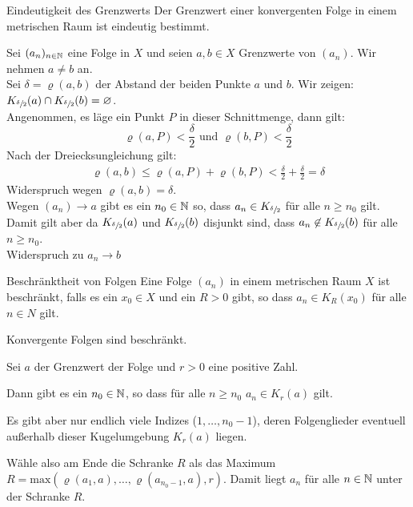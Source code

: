 \begin{satz}{Eindeutigkeit des Grenzwerts}
	Der Grenzwert einer konvergenten Folge in einem metrischen Raum ist eindeutig bestimmt.
\end{satz}
\beweis
Sei $(a_n)_{n\in\mathbb{N}}$ eine Folge in $X$ und seien $a,b\in X$ Grenzwerte von $(a_n)$. Wir nehmen $a\neq b$ an.\\
Sei $\delta=\varrho(a,b)$ der Abstand der beiden Punkte $a$ und $b$. Wir zeigen: $K_{\sfrac{\delta}{2}}(a)\cap K_{\sfrac{\delta}{2}}(b)=\varnothing$.\\
Angenommen, es läge ein Punkt $P$ in dieser Schnittmenge, dann gilt:
\begin{equation*}
	\varrho(a,P)<\frac\delta2 \text{ und } \varrho(b,P)<\frac\delta2
\end{equation*}
Nach der Dreiecksungleichung gilt:
\begin{align*}
	\varrho(a,b)\leq \varrho(a,P) + \varrho(b,P) < \frac\delta2 + \frac\delta2 = \delta
\end{align*}
Widerspruch wegen $\varrho(a,b)=\delta$.\\
Wegen $(a_n)\rightarrow a$ gibt es ein $n_0\in\mathbb{N}$ so, dass $a_n\in K_{\sfrac\delta2}$ für alle $n\geq n_0$ gilt.\\
Damit gilt aber da $K_{\sfrac{\delta}{2}}(a)$ und $K_{\sfrac{\delta}{2}}(b)$ disjunkt sind, dass $a_n\not\in K_{\sfrac{\delta}{2}}(b)$ für alle $n\geq n_0$.\\
Widerspruch zu $a_n\rightarrow b$

\begin{definition}{Beschränktheit von Folgen}
	Eine Folge $(a_n)$ in einem metrischen Raum $X$ ist beschränkt, falls es ein $x_0\in X$ und ein $R>0$ gibt, so dass $a_n\in K_R(x_0)$ für alle $n\in N$ gilt.
\end{definition}
\begin{satz}{}
	Konvergente Folgen sind beschränkt.
\end{satz}
\beweis
Sei $a$ der Grenzwert der Folge und $r>0$ eine positive Zahl.

Dann gibt es ein $n_0\in\mathbb{N}$, so dass für alle $n\geq n_0$ $a_n\in K_r(a)$ gilt.

Es gibt aber nur endlich viele Indizes ($1,\ldots,n_0-1$), deren Folgenglieder eventuell außerhalb dieser Kugelumgebung $K_r(a)$ liegen.

Wähle also am Ende die Schranke $R$ als das Maximum $R=\mathrm{max}(\varrho(a_1,a),\ldots,\varrho(a_{n_0-1},a),r)$. Damit liegt $a_n$ für alle $n\in\mathbb{N}$ unter der Schranke $R$.
